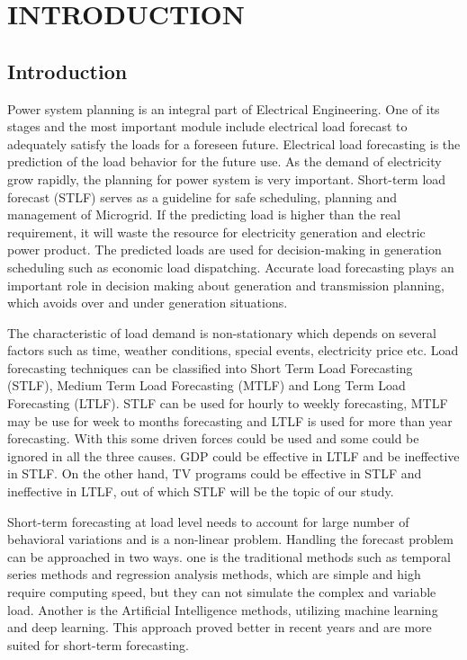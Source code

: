 \documentclass[12pt]{book}
\begin{document}
	\chapter{INTRODUCTION}
	\section{Introduction}
		Power system planning is an integral part of Electrical Engineering. One of its stages and the most important module include electrical load forecast to adequately satisfy the loads for a foreseen future. Electrical load forecasting is the prediction of the load behavior for the future use. As the demand of electricity grow rapidly, the planning for power system is very important. Short-term load forecast (STLF) serves as a guideline for safe scheduling, planning and management of Microgrid.
If the predicting load is higher than the real requirement, it will waste the resource for electricity generation and electric power product. The predicted loads are used for decision-making in generation scheduling such as economic load dispatching. Accurate load forecasting plays an important role in decision making about generation and transmission planning, which avoids over and under generation situations. 

The characteristic of load demand is non-stationary which depends on several factors such as time, weather conditions, special events, electricity price etc. Load forecasting techniques can be classified into Short Term Load Forecasting (STLF), Medium Term Load Forecasting (MTLF) and Long Term Load Forecasting (LTLF).
STLF can be used for hourly to weekly forecasting, MTLF may be use for week to months forecasting and LTLF is used for more than year forecasting. With this some driven forces could be used and some could be ignored in all the three causes. GDP could be effective in LTLF and be ineffective in STLF. On the other hand, TV programs could be effective in STLF and ineffective in LTLF,  out of which STLF will be the topic of our study. 

Short-term forecasting at load level needs to account for large number of behavioral variations and is a non-linear problem.
Handling the forecast problem can be approached in two ways. 
one is the traditional methods such as temporal series methods and regression analysis methods, which are simple and high require computing speed, but they can not simulate the complex and variable load. Another is the Artificial Intelligence methods, utilizing machine learning and deep learning. This approach proved better in recent years and are more suited for short-term forecasting.
\end{document}
